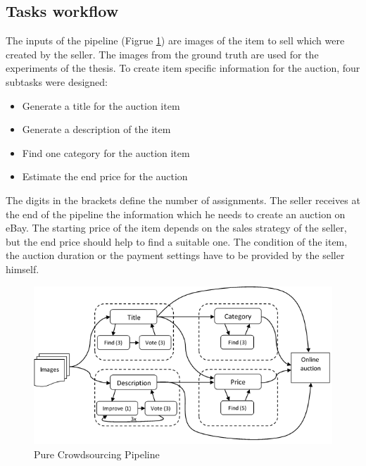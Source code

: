 \subsection{Tasks workflow}
The inputs of the pipeline (Figrue \ref{purePipeline}) are images of the item to sell which were created by the seller. The images from the ground truth are used for the experiments of the thesis. To create item specific information for the auction, four subtasks were designed: 
\begin{itemize}
	\item Generate a title for the auction item
	\item Generate a description of the item
	\item Find one category for the auction item  
	\item Estimate the end price for the auction  
\end{itemize}
The digits in the brackets define the number of assignments. The seller receives at the end of the pipeline the information which he needs to create an auction on eBay. The starting price of the item depends on the sales strategy of the seller, but the end price should help to find a suitable one. The condition of the item, the auction duration or the payment settings have to be provided by the seller himself.
\begin{figure}[h!]
\centering
\includegraphics[scale=0.8]{images/pipelines/Pure_Pipeline.png}
\caption{Pure Crowdsourcing Pipeline}
\label{purePipeline}
\end{figure}

